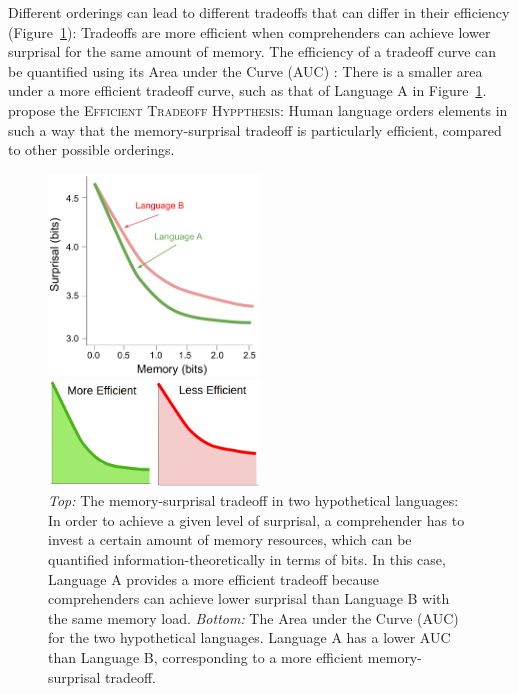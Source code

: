 \documentclass[11pt,letterpaper]{article}
\newcommand{\citep}{\parencite}
\newcommand{\citet}{\Textcite}
\newcommand\mhahn[1]{{\color{red}(#1)}}
\begin{document}
Different orderings can lead to different tradeoffs that can differ in their efficiency (Figure~\ref{fig:tradeoff}): Tradeoffs are more efficient when comprehenders can achieve lower surprisal for the same amount of memory.
The efficiency of a tradeoff curve can be quantified using its Area under the Curve (AUC) \citep{Hahn2020modeling}: There is a smaller area under a more efficient tradeoff curve, such as that of Language A in Figure~\ref{fig:tradeoff}.
\citet{Hahn2020modeling} propose the \textsc{Efficient Tradeoff Hyppthesis}: Human language orders elements in such a way that the memory-surprisal tradeoff is particularly efficient, compared to other possible orderings.

\begin{figure}
    \centering
    \includegraphics[width=0.5\textwidth]{figures/tradeoff.pdf} %
    
    \includegraphics[width=0.5\textwidth]{figures/auc-viz.png}
    \caption{\textit{Top:} The memory-surprisal tradeoff in two hypothetical languages: In order to achieve a given level of surprisal, a comprehender has to invest a certain amount of memory resources, which can be quantified information-theoretically in terms of bits. In this case, Language A provides a more efficient tradeoff because comprehenders can achieve lower surprisal than Language B with the same  memory load.
    \textit{Bottom:} The Area under the Curve (AUC) for the two hypothetical languages. Language A has a lower AUC than Language B, corresponding to a more efficient memory-surprisal tradeoff.}
    \label{fig:tradeoff}
\end{figure}
\end{document}
